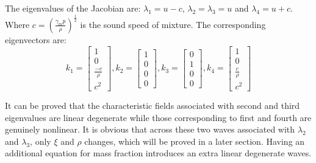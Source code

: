 The eigenvalues of the Jacobian are: $\lambda_1 = u-c$,  $\lambda_2 = \lambda_3 = u$ and $\lambda_4 = u+c$. Where $c=(\frac{\gamma_m p}{\rho})^{\frac{1}{2}}$ is the sound speed of mixture. The corresponding eigenvectors are: 
\begin{equation}
   k_1 =\begin{bmatrix}
         1 \\
         0 \\
         \frac{-c}{\rho} \\
         c^2
     \end{bmatrix},
   k_2 =\begin{bmatrix}
         1 \\
         0 \\
         0   \\
         0
     \end{bmatrix},
   k_3 =\begin{bmatrix}
         0 \\
         1 \\
         0   \\
         0
     \end{bmatrix},
   k_4 =\begin{bmatrix}
         1 \\
         0 \\
         \frac{c}{\rho} \\
         c^2
     \end{bmatrix}
     \label{eq:eigenvector-pressure}
\end{equation}

It can be proved that the characteristic fields associated with second and third eigenvalues are linear degenerate while those corresponding to first and fourth are genuinely nonlinear. It is obvious that across these two waves associated with $\lambda_2$ and $\lambda_3$, only $\xi$ and $\rho$ changes, which will be proved in a later section. Having an additional equation for mass fraction introduces an extra linear degenerate waves.

